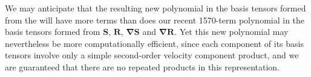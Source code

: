 We may anticipate that the resulting new polynomial in the basis tensors formed from the   will have more terms than does our recent 1570-term polynomial in the basis tensors formed from $\mathbf{S}$, $\mathbf{R}$, $\mathbf{\nabla S}$ and $\mathbf{\nabla R}$. Yet this new polynomial may nevertheless be more computationally efficient, since each component of its basis tensors involve only a simple second-order velocity component product, and we are guaranteed that there are no repeated products in this representation. 












